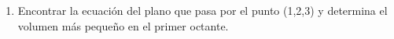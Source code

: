 \documentclass[fleqn, 12pt]{article}
\begin{document}
\begin{enumerate}
        \item Encontrar la ecuación del plano que pasa por el punto (1,2,3) y determina el volumen más pequeño en el primer octante.
        
    \end{enumerate}
\end{document}
